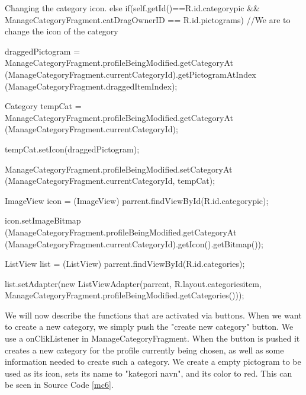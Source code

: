 \begin{source}[{mc5}]{Changing the category icon.}
else if(self.getId()==R.id.categorypic && ManageCategoryFragment.catDragOwnerID == R.id.pictograms) //We are to change the icon of the category
				{
					draggedPictogram = ManageCategoryFragment.profileBeingModified.getCategoryAt
						(ManageCategoryFragment.currentCategoryId).getPictogramAtIndex
						(ManageCategoryFragment.draggedItemIndex);
					
					Category tempCat = ManageCategoryFragment.profileBeingModified.getCategoryAt
						(ManageCategoryFragment.currentCategoryId);
					
					tempCat.setIcon(draggedPictogram);
					
					ManageCategoryFragment.profileBeingModified.setCategoryAt
						(ManageCategoryFragment.currentCategoryId, tempCat);
					
					ImageView icon = (ImageView) parrent.findViewById(R.id.categorypic);
					
					icon.setImageBitmap
						(ManageCategoryFragment.profileBeingModified.getCategoryAt
						(ManageCategoryFragment.currentCategoryId).getIcon().getBitmap());
					
					ListView list = (ListView) parrent.findViewById(R.id.categories);
					
					list.setAdapter(new ListViewAdapter(parrent, R.layout.categoriesitem,
						ManageCategoryFragment.profileBeingModified.getCategories()));
				}
\end{source}
We will now describe the functions that are activated via buttons.
When we want to create a new category, we simply push the "create new category" button. 
We use a onClikListener in ManageCategoryFragment.
When the button is pushed it creates a new category for the profile currently being chosen, as well as some information needed to create such a category. 
We create a empty pictogram to be used as its icon, sets its name to "kategori navn", and its color to red. 
This can be seen in Source Code \ref{mc6}.

